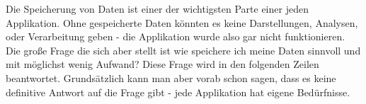 Die Speicherung von Daten ist einer der wichtigsten Parte einer jeden Applikation. Ohne gespeicherte Daten könnten es keine Darstellungen, Analysen, oder Verarbeitung geben - die Applikation wurde also gar nicht funktionieren. Die große Frage die sich aber stellt ist wie speichere ich meine Daten sinnvoll und mit möglichst wenig Aufwand? Diese Frage wird in den folgenden Zeilen beantwortet. Grundsätzlich kann man aber vorab schon sagen, dass es keine definitive Antwort auf die Frage gibt - jede Applikation hat eigene Bedürfnisse.
